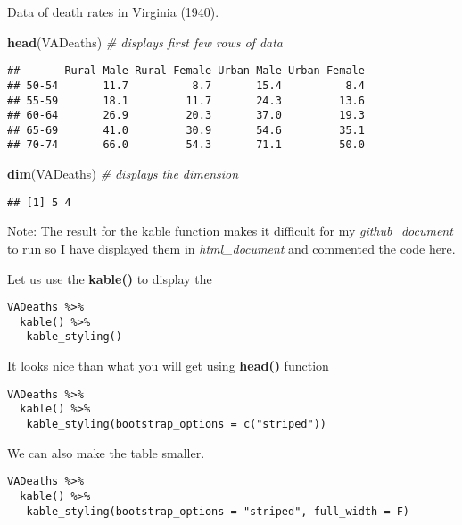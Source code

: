\documentclass[]{article}
\newenvironment{Shaded}{\begin{snugshade}}{\end{snugshade}}
\newcommand{\KeywordTok}[1]{\textcolor[rgb]{0.13,0.29,0.53}{\textbf{{#1}}}}
\newcommand{\CommentTok}[1]{\textcolor[rgb]{0.56,0.35,0.01}{\textit{{#1}}}}
\newcommand{\NormalTok}[1]{{#1}}
\begin{document}
Data of death rates in Virginia (1940).

\begin{Shaded}
\begin{Highlighting}[]
\KeywordTok{head}\NormalTok{(VADeaths)  }\CommentTok{# displays first few rows of data}
\end{Highlighting}
\end{Shaded}

\begin{verbatim}
##       Rural Male Rural Female Urban Male Urban Female
## 50-54       11.7          8.7       15.4          8.4
## 55-59       18.1         11.7       24.3         13.6
## 60-64       26.9         20.3       37.0         19.3
## 65-69       41.0         30.9       54.6         35.1
## 70-74       66.0         54.3       71.1         50.0
\end{verbatim}

\begin{Shaded}
\begin{Highlighting}[]
\KeywordTok{dim}\NormalTok{(VADeaths)  }\CommentTok{# displays the dimension}
\end{Highlighting}
\end{Shaded}

\begin{verbatim}
## [1] 5 4
\end{verbatim}

Note: The result for the kable function makes it difficult for my
\emph{github\_document} to run so I have displayed them in
\emph{html\_document} and commented the code here.

Let us use the \textbf{kable()} to display the

\begin{verbatim}
VADeaths %>%
  kable() %>%
   kable_styling() 
\end{verbatim}

It looks nice than what you will get using \textbf{head()} function

\begin{verbatim}
VADeaths %>%
  kable() %>%
   kable_styling(bootstrap_options = c("striped")) 
\end{verbatim}

We can also make the table smaller.

\begin{verbatim}
VADeaths %>%
  kable() %>%
   kable_styling(bootstrap_options = "striped", full_width = F) 
\end{verbatim}
\end{document}
